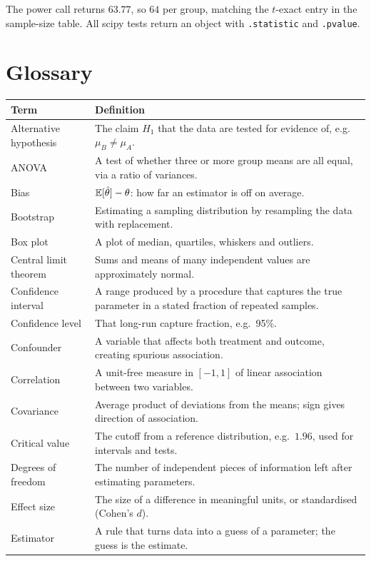 The power call returns $63.77$, so $64$ per group, matching the $t$-exact entry in the sample-size table. All scipy tests return an object with \texttt{.statistic} and \texttt{.pvalue}.

\section{Glossary}

\small
\begin{longtable}{@{}p{3.6cm}p{11.2cm}@{}}
\toprule
Term & Definition \\
\midrule
\endhead
Alternative hypothesis & The claim $H_1$ that the data are tested for evidence of, e.g.\ $\mu_B\ne\mu_A$. \\
ANOVA & A test of whether three or more group means are all equal, via a ratio of variances. \\
Bias & $\operatorname{\mathbb{E}}[\hat\theta]-\theta$: how far an estimator is off on average. \\
Bootstrap & Estimating a sampling distribution by resampling the data with replacement. \\
Box plot & A plot of median, quartiles, whiskers and outliers. \\
Central limit theorem & Sums and means of many independent values are approximately normal. \\
Confidence interval & A range produced by a procedure that captures the true parameter in a stated fraction of repeated samples. \\
Confidence level & That long-run capture fraction, e.g.\ 95\%. \\
Confounder & A variable that affects both treatment and outcome, creating spurious association. \\
Correlation & A unit-free measure in $[-1,1]$ of linear association between two variables. \\
Covariance & Average product of deviations from the means; sign gives direction of association. \\
Critical value & The cutoff from a reference distribution, e.g.\ $1.96$, used for intervals and tests. \\
Degrees of freedom & The number of independent pieces of information left after estimating parameters. \\
Effect size & The size of a difference in meaningful units, or standardised (Cohen's $d$). \\
Estimator & A rule that turns data into a guess of a parameter; the guess is the estimate. \\

\end{longtable}
